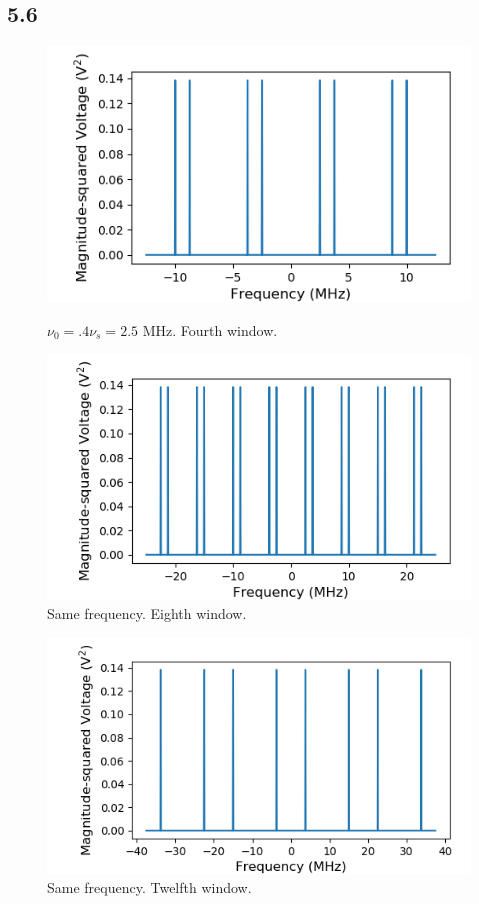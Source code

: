 \documentclass[a4paper]{article}
\begin{document}
\subsection{5.6}

\begin{figure}
\centering
\begin{minipage}{.5\textwidth}
	\centering
	\includegraphics[width=.9\linewidth]{5-6/4window}
	\caption{$\nu_0 = .4 \nu_s = 2.5$ MHz. Fourth window.}
	\label{fig:win4}
\end{minipage}%
\begin{minipage}{.5\textwidth}
	\centering
	\includegraphics[width=.9\linewidth]{5-6/8window}
	\caption{Same frequency. Eighth window.}
	\label{fig:win8}
\end{minipage}
\end{figure}

\begin{figure}
\centering
\includegraphics[width=.45\linewidth]{5-6/12window}
\caption{Same frequency. Twelfth window.}
\label{fig:win12}
\end{figure}
\end{document}
